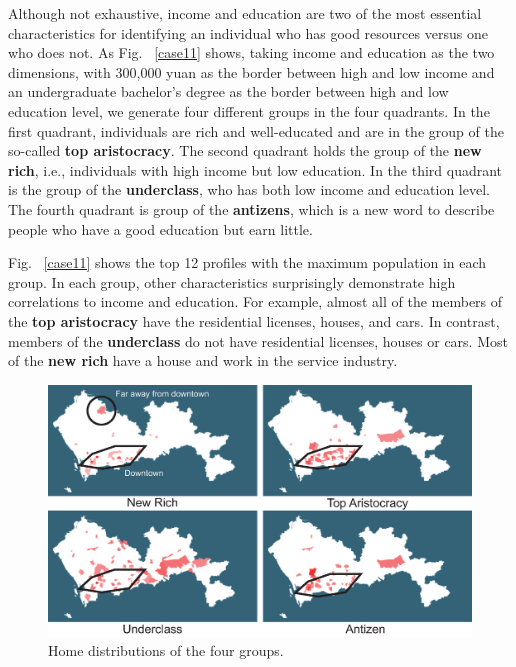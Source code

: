\documentclass{ieeeaccess}
\begin{document}
Although not exhaustive, income and education are two of the most essential characteristics for identifying an individual who has good resources versus one who does not. As Fig. ~\ref{case11} shows, taking income and education as the two dimensions, with 300,000 yuan as the border between high and low income and an undergraduate bachelor's degree as the border between high and low education level, we generate four different groups in the four quadrants. In the first quadrant, individuals are rich and well-educated and are in the group of the so-called \textbf{top aristocracy}. The second quadrant holds the group of the \textbf{new rich}, i.e., individuals with high income but low education. In the third quadrant is the group of the \textbf{underclass}, who has both low income and education level. The fourth quadrant is group of the \textbf{antizens}, which is a new word to describe people who have a good education but earn little.


Fig. ~\ref{case11} shows the top 12 profiles with the maximum population in each group. In each group, other characteristics surprisingly demonstrate high correlations to income and education. For example, almost all of the members of the \textbf{top aristocracy} have the residential licenses,  houses, and cars. In contrast, members of the \textbf{underclass} do not have residential licenses, houses or cars. Most of the \textbf{new rich} have a house and work in the service industry.


\begin{figure}[htb!]
 \centering %
 \includegraphics[width=\columnwidth]{pictures/case1_2}
 \caption{Home distributions of the four groups.}
 \label{case12}
\end{figure}
\end{document}
